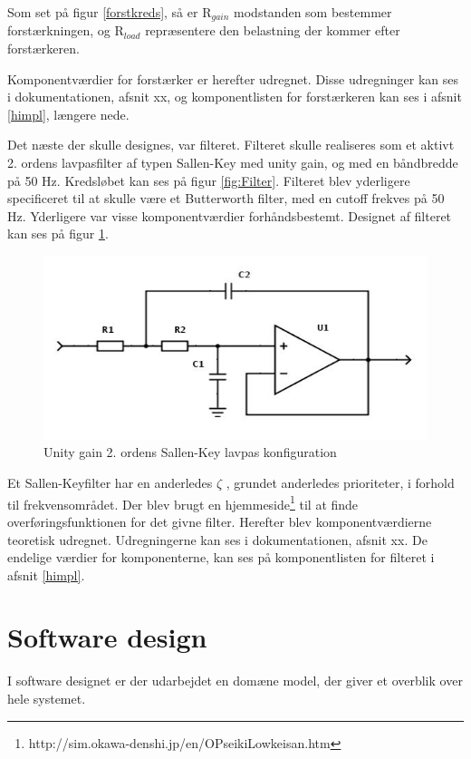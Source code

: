 Som set på figur \ref{forstkreds}, så er R$_{gain}$ modstanden som bestemmer forstærkningen, og R$_{load}$ repræsentere den belastning der kommer efter forstærkeren. 

Komponentværdier for forstærker er herefter udregnet. Disse udregninger kan ses i dokumentationen, afsnit xx, og komponentlisten for forstærkeren kan ses i afsnit \ref{himpl}, længere nede. 

Det næste der skulle designes, var filteret. Filteret skulle realiseres som et aktivt 2. ordens lavpasfilter af typen Sallen-Key med unity gain, og med en båndbredde på 50 Hz. Kredsløbet kan ses på figur \ref{fig:Filter}. Filteret blev yderligere specificeret til at skulle være et Butterworth filter, med en cutoff frekves på 50 Hz. Yderligere var visse komponentværdier forhåndsbestemt. Designet af filteret kan ses på figur \ref{fig:rFilter}.

\begin{figure}[H]
	\centering
	\includegraphics[width=1\textwidth]{Figurer/Hardware/FilterDesign}
	\caption{Unity gain 2. ordens Sallen-Key lavpas konfiguration}
	\label{fig:rFilter}
\end{figure}

Et Sallen-Keyfilter har en anderledes $\zeta$ , grundet anderledes prioriteter, i forhold til frekvensområdet. Der blev brugt en hjemmeside\footnote{http://sim.okawa-denshi.jp/en/OPseikiLowkeisan.htm} til at finde overføringsfunktionen for det givne filter. Herefter blev komponentværdierne teoretisk udregnet. Udregningerne kan ses i dokumentationen, afsnit xx. De endelige værdier for komponenterne, kan ses på komponentlisten for filteret i afsnit \ref{himpl}. 
   
   
\section{Software design}\label{Software arkitektur}
   I software designet er der udarbejdet en domæne model, der giver et overblik over hele systemet.
   
